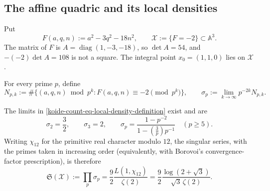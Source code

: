 \subsection{The affine quadric and its local densities}
\label{koide-count-subsec-local}

Put
\begin{equation}
 F(a,q,n):=a^2-3q^2-18n^2,
 \qquad
 \mathscr X:=\{F=-2\}\subset\mathbb A^3.
 \label{koide-count-eq-affine-quadric}
\end{equation}
The matrix of \(F\) is
\(A=\operatorname{diag}(1,-3,-18)\), so
\(\det A=54\), and
\(-(-2)\det A=108\) is not a square.  The integral point
\(x_0=(1,1,0)\) lies on \(\mathscr X\).

For every prime \(p\), define
\begin{equation}
 N_{p,k}:=
 \#\{(a,q,n)\bmod p^k:F(a,q,n)\equiv-2\pmod{p^k}\},
 \qquad
 \sigma_p:=\lim_{k\to\infty}p^{-2k}N_{p,k}.
 \label{koide-count-eq-local-density-definition}
\end{equation}

\begin{theorem}
\label{koide-count-thm-local-densities}
The limits in \eqref{koide-count-eq-local-density-definition} exist and
are
\begin{equation}
 \sigma_2=\frac32,
 \qquad
 \sigma_3=2,
 \qquad
 \sigma_p=
 \frac{1-p^{-2}}{1-\left(\frac3p\right)p^{-1}}
 \quad(p\geq5).
 \label{koide-count-eq-all-local-densities}
\end{equation}
Writing \(\chi_{12}\) for the primitive real character modulo \(12\), the
singular series, with the primes taken in increasing order (equivalently,
with Borovoi's convergence-factor prescription), is therefore
\begin{equation}
 \mathfrak S(\mathscr X):=\prod_p\sigma_p
 =\frac92\frac{L(1,\chi_{12})}{\zeta(2)}
 =\frac92\frac{\log(2+\sqrt3)}{\sqrt3\,\zeta(2)}.
 \label{koide-count-eq-singular-series}
\end{equation}
\end{theorem}

